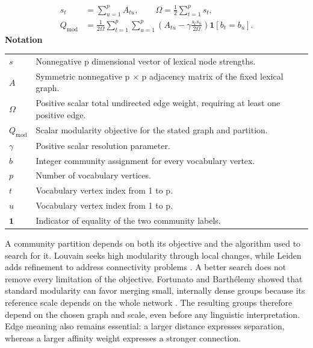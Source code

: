 \documentclass[10pt,letterpaper]{article}
\newcommand{\notlabel}{\noindent\textbf{Notation}\par\nobreak\vspace{4pt}}
\begin{document}
\par\noindent\begin{minipage}{\linewidth}
\begin{equation}\label{eq:modularity}
\begin{aligned}s_t&=\sum_{u=1}^{p}A_{tu},\qquad\Omega=\frac12\sum_{t=1}^{p}s_t,\\Q_{\mathrm{mod}}&=\frac1{2\Omega}\sum_{t=1}^{p}\sum_{u=1}^{p}\left(A_{tu}-\gamma\frac{s_t s_u}{2\Omega}\right)\mathbf1[b_t=b_u].\end{aligned}
\end{equation}
\notlabel
{\fontsize{8.5}{10.5}\selectfont\setlength{\tabcolsep}{0pt}\renewcommand{\arraystretch}{1.12}
\begin{tabularx}{\linewidth}{@{}p{.14\linewidth}X@{}}
$s$ & Nonnegative p dimensional vector of lexical node strengths.\\
$A$ & Symmetric nonnegative p \ensuremath{\times} p adjacency matrix of the fixed lexical graph.\\
$\Omega$ & Positive scalar total undirected edge weight, requiring at least one positive edge.\\
$Q_{\mathrm{mod}}$ & Scalar modularity objective for the stated graph and partition.\\
$\gamma$ & Positive scalar resolution parameter.\\
$b$ & Integer community assignment for every vocabulary vertex.\\
$p$ & Number of vocabulary vertices.\\
$t$ & Vocabulary vertex index from 1 to p.\\
$u$ & Vocabulary vertex index from 1 to p.\\
$\mathbf1$ & Indicator of equality of the two community labels.\\
\end{tabularx}}
\par\vspace{2pt}
\end{minipage}\par
A community partition depends on both its objective and the algorithm used to search for it. Louvain seeks high modularity through local changes, while Leiden adds refinement to address connectivity problems \cite{blondel,leiden}. A better search does not remove every limitation of the objective. Fortunato and Barthélemy showed that standard modularity can favor merging small, internally dense groups because its reference scale depends on the whole network \cite{fortunato}. The resulting groups therefore depend on the chosen graph and scale, even before any linguistic interpretation. Edge meaning also remains essential: a larger distance expresses separation, whereas a larger affinity weight expresses a stronger connection.\par
\end{document}
